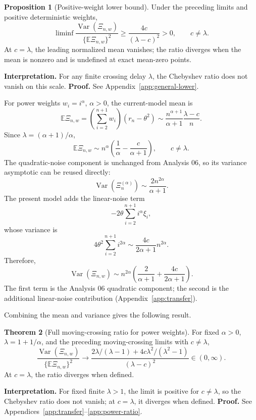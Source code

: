 \documentclass[11pt]{article}
\theoremstyle{definition}
\newtheorem{theorem}{Theorem}[section]
\newtheorem{proposition}[theorem]{Proposition}
\begin{document}
\begin{samepage}
\begin{proposition}[Positive-weight lower bound]\label{prop:lower}
Under the preceding limits and positive deterministic weights,
\[
\liminf\frac{\operatorname{Var}(\Xi_{n,w})}
{\{\mathbb E\Xi_{n,w}\}^2}
\ge\frac{4c}{(\lambda-c)^2}>0,\qquad c\ne\lambda.
\]
At $c=\lambda$, the leading normalized mean vanishes; the ratio diverges
when the mean is nonzero and is undefined at exact mean-zero points.
\end{proposition}
\noindent\textbf{Interpretation.} For any finite crossing delay $\lambda$,
the Chebyshev ratio does not vanish on this scale.
\textbf{Proof.} See Appendix~\ref{app:general-lower}.
\end{samepage}

\medskip
For power weights $w_i=i^\alpha$, $\alpha>0$, the current-model mean is
\[
\mathbb E\Xi_{n,w}
=\left(\sum_{i=2}^{n+1}w_i\right)(r_n-\theta^2)
\sim\frac{n^{\alpha+1}}{\alpha+1}\frac{\lambda-c}{n}.
\]
Since $\lambda=(\alpha+1)/\alpha$,
\[
\mathbb E\Xi_{n,w}
\sim n^\alpha\left(\frac1\alpha-\frac{c}{\alpha+1}\right),
\qquad c\ne\lambda.
\]
The quadratic-noise component is unchanged from Analysis 06, so its
variance asymptotic can be reused directly:
\[
\operatorname{Var}(\Xi_n^{(\alpha)})\sim\frac{2n^{2\alpha}}{\alpha+1}.
\]
The present model adds the linear-noise term
\[
-2\theta\sum_{i=2}^{n+1}i^\alpha\xi_i,
\]
whose variance is
\[
4\theta^2\sum_{i=2}^{n+1}i^{2\alpha}
\sim\frac{4c}{2\alpha+1}n^{2\alpha}.
\]
Therefore,
\[
\operatorname{Var}(\Xi_{n,w})
\sim n^{2\alpha}\left(\frac2{\alpha+1}+\frac{4c}{2\alpha+1}\right).
\]
The first term is the Analysis 06 quadratic component; the second is
the additional linear-noise contribution (Appendix~\ref{app:transfer}).

Combining the mean and variance gives the following result.
\begin{theorem}[Full moving-crossing ratio for power weights]\label{thm:ratio}
For fixed $\alpha>0$, $\lambda=1+1/\alpha$, and the preceding
moving-crossing limits with $c\ne\lambda$,
\begin{equation}\label{eq:full-ratio}
\frac{\operatorname{Var}(\Xi_{n,w})}{\{\mathbb E\Xi_{n,w}\}^2}
\to
\frac{2\lambda/(\lambda-1)+4c\lambda^2/(\lambda^2-1)}
{(\lambda-c)^2}\in(0,\infty).
\end{equation}
At $c=\lambda$, the ratio diverges when defined.
\end{theorem}
\noindent\textbf{Interpretation.} For fixed finite $\lambda>1$, the
limit is positive for $c\ne\lambda$, so the Chebyshev ratio does not
vanish; at $c=\lambda$, it diverges when defined.
\textbf{Proof.} See Appendices~\ref{app:transfer}--\ref{app:power-ratio}.
\end{document}
